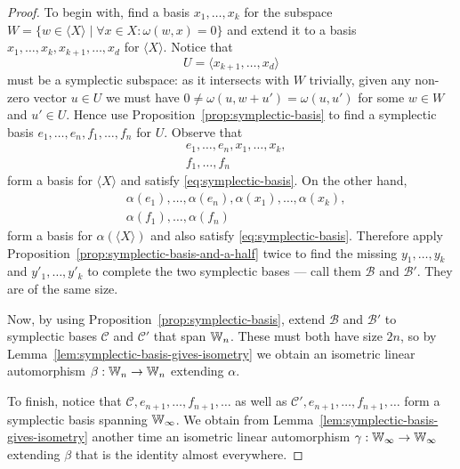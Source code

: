 \begin{proof}
    To begin with, find a basis $x_1, \ldots, x_k$ for the subspace $W = \{ w \in \langle X \rangle \mid \forall x \in X : \omega(w, x) = 0 \}$ 
    and extend it to a basis \(
        x_1, \ldots, x_k, x_{k+1}, \ldots, x_d
    \) for $\langle X \rangle$.
    Notice that
    \[
        U = \langle x_{k+1}, \ldots, x_d \rangle
    \] must be a symplectic subspace:
    as it intersects with $W$ trivially, 
    given any non-zero vector $u \in U$ we must have $0 \neq \omega(u, w + u') = \omega(u, u')$ for some $w \in W$ and $u' \in U$.
    Hence use Proposition~\ref{prop:symplectic-basis} to find a symplectic basis
    \(
        e_1, \ldots, e_n,
        f_1, \ldots, f_n
    \)
    for $U$.
    Observe that 
    \begin{align*}
        &e_1, \ldots, e_n, x_1, \ldots, x_k, \\
        &f_1, \ldots, f_n
    \end{align*}
    form a basis for $\langle X \rangle$ and satisfy \eqref{eq:symplectic-basis}.
    On the other hand,
    \begin{align*}
        &\alpha(e_1), \ldots, \alpha(e_n), \alpha(x_1), \ldots, \alpha(x_k), \\
        &\alpha(f_1), \ldots, \alpha(f_n)
    \end{align*}
    form a basis for $\alpha(\langle X \rangle)$ and also satisfy \eqref{eq:symplectic-basis}.
    Therefore apply Proposition~\ref{prop:symplectic-basis-and-a-half} twice to find the missing 
    $y_1, \ldots, y_k$ and $y'_1, \ldots, y'_k$ to complete the two symplectic bases --- call them $\mathcal{B}$ and $\mathcal{B}'$.
    They are of the same size.

    Now, by using Proposition~\ref{prop:symplectic-basis}, extend $\mathcal{B}$ and $\mathcal{B}'$ to symplectic bases $\mathcal{C}$ and $\mathcal{C}'$ that span $\mathbb{W}_n$.
    These must both have size $2n$, 
    so by Lemma~\ref{lem:symplectic-basis-gives-isometry} we obtain an isometric linear automorphism $\beta : \mathbb{W}_n \to \mathbb{W}_n$ extending $\alpha$.

    To finish, notice that $\mathcal{C}, e_{n+1}, \ldots, f_{n+1}, \ldots$ as well as $\mathcal{C}', e_{n+1}, \ldots, f_{n+1}, \ldots$ 
    form a symplectic basis spanning $\mathbb{W}_\infty$.
    We obtain from Lemma~\ref{lem:symplectic-basis-gives-isometry} another time an isometric linear automorphism $\gamma : \mathbb{W}_\infty \to \mathbb{W}_\infty$ extending $\beta$ 
    that is the identity almost everywhere.
\end{proof}


